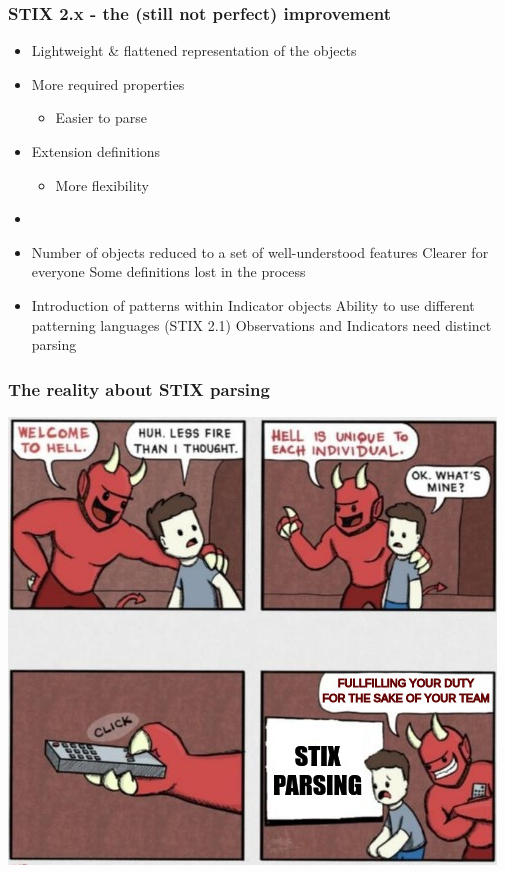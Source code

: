 \begin{frame}
    \frametitle{STIX 2.x - the (still not perfect) improvement}
    \begin{itemize}
        \item Lightweight \& flattened representation of the objects
        \item More required properties
        \begin{itemize}
            \item Easier to parse
        \end{itemize}
        \item Extension definitions
        \begin{itemize}
            \item More flexibility
        \end{itemize}
        \item []
        \item Number of objects reduced to a set of well-understood features
        \linebreak \faPlusCircle \hspace{0.3em} Clearer for everyone
        \linebreak \faMinusCircle \hspace{0.3em} Some definitions lost in the process
        \item Introduction of patterns within Indicator objects
        \linebreak \faPlusCircle \hspace{0.3em} Ability to use different patterning languages (STIX 2.1)
        \linebreak \faMinusCircle \hspace{0.3em} Observations and Indicators need distinct parsing
    \end{itemize}
\end{frame}

\begin{frame}
    \frametitle{The reality about STIX parsing}
    \centering
    \includegraphics[scale=0.45]{images/hell.png}
\end{frame}

